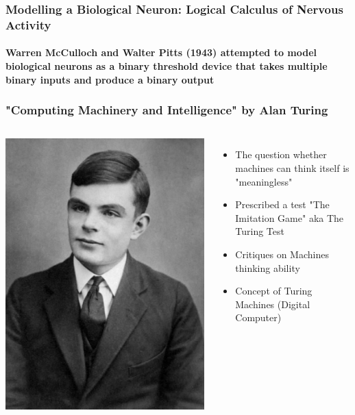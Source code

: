 \documentclass{beamer}
\begin{document}
\begin{frame}
  \frametitle{Modelling a Biological Neuron: Logical Calculus of Nervous Activity}
  \framesubtitle{Warren McCulloch and Walter Pitts (1943) attempted to model biological neurons as a binary threshold device that takes multiple binary inputs and produce a binary output}


\end{frame}

\begin{frame}
  \frametitle{"Computing Machinery and Intelligence" by Alan Turing}
  
  \begin{columns}
    
    \includegraphics[width=\textwidth]{"Alan-Turing.jpg"}
    
    \begin{itemize}
      \item The question whether machines can think itself is "meaningless"
      \item Prescribed a test "The Imitation Game" aka The Turing Test
      \item Critiques on Machines thinking ability
      \item Concept of Turing Machines (Digital Computer) 
    \end{itemize}
  \end{columns}
\end{frame}
\end{document}
